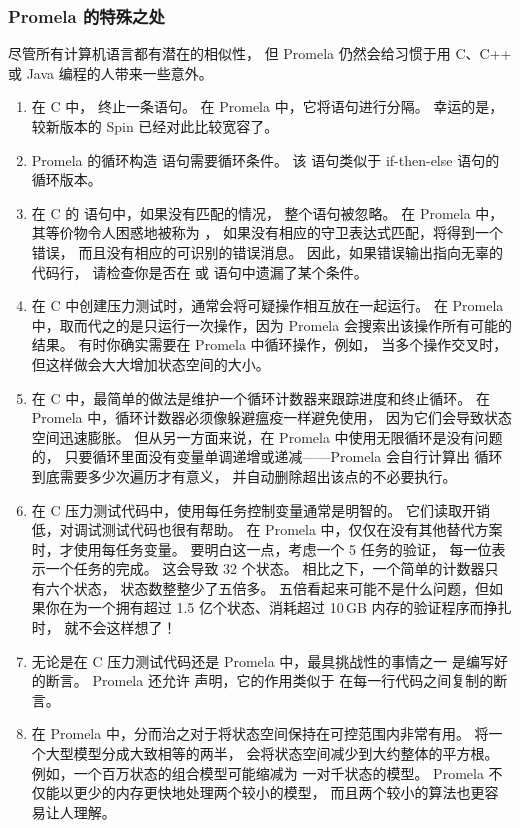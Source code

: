 \subsubsection{Promela 的特殊之处}
\label{sec:formal:Promela Peculiarities}

尽管所有计算机语言都有潜在的相似性，
但 Promela 仍然会给习惯于用 C、C++ 或 Java 编程的人带来一些意外。

\begin{enumerate}
\item	在 C 中，\qco{;} 终止一条语句。
	在 Promela 中，它将语句进行分隔。
	幸运的是，较新版本的 Spin 已经对此比较宽容了。
\item	Promela 的循环构造  语句需要循环条件。
	该  语句类似于 if-then-else 语句的循环版本。
\item	在 C 的  语句中，如果没有匹配的情况，
	整个语句被忽略。
	在 Promela 中，其等价物令人困惑地被称为 ，
	如果没有相应的守卫表达式匹配，将得到一个错误，
	而且没有相应的可识别的错误消息。
	因此，如果错误输出指向无辜的代码行，
	请检查你是否在  或  语句中遗漏了某个条件。
\item	在 C 中创建压力测试时，通常会将可疑操作相互放在一起运行。
	在 Promela 中，取而代之的是只运行一次操作，因为 Promela
	会搜索出该操作所有可能的结果。
	有时你确实需要在 Promela 中循环操作，例如，
	当多个操作交叉时，但这样做会大大增加状态空间的大小。
\item	在 C 中，最简单的做法是维护一个循环计数器来跟踪进度和终止循环。
	在 Promela 中，循环计数器必须像躲避瘟疫一样避免使用，
	因为它们会导致状态空间迅速膨胀。
	但从另一方面来说，在 Promela 中使用无限循环是没有问题的，
	只要循环里面没有变量单调递增或递减——Promela 会自行计算出
	循环到底需要多少次遍历才有意义，
	并自动删除超出该点的不必要执行。
\item	在 C 压力测试代码中，使用每任务控制变量通常是明智的。
	它们读取开销低，对调试测试代码也很有帮助。
	在 Promela 中，仅仅在没有其他替代方案时，才使用每任务变量。
	要明白这一点，考虑一个 5 任务的验证，
	每一位表示一个任务的完成。
	这会导致 32 个状态。
	相比之下，一个简单的计数器只有六个状态，
	状态数整整少了五倍多。
	五倍看起来可能不是什么问题，但如果你在为一个拥有超过
	1.5 亿个状态、消耗超过 10\,GB 内存的验证程序而挣扎时，
	就不会这样想了！
\item	无论是在 C 压力测试代码还是 Promela 中，最具挑战性的事情之一
	是编写好的断言。
	Promela 还允许  声明，它的作用类似于
	在每一行代码之间复制的断言。
\item	在 Promela 中，分而治之对于将状态空间保持在可控范围内非常有用。
	将一个大型模型分成大致相等的两半，
	会将状态空间减少到大约整体的平方根。
	例如，一个百万状态的组合模型可能缩减为
	一对千状态的模型。
	Promela 不仅能以更少的内存更快地处理两个较小的模型，
	而且两个较小的算法也更容易让人理解。
\end{enumerate}


